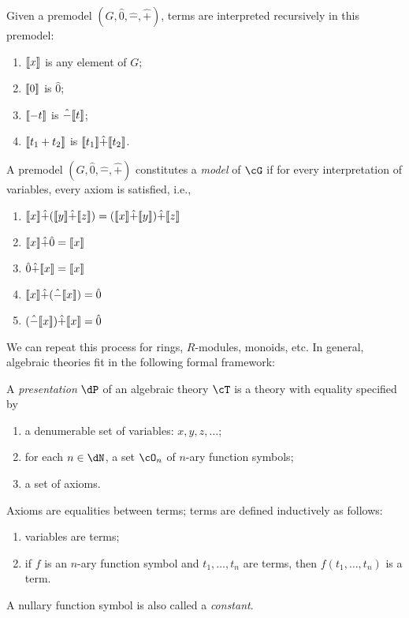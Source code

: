 \documentclass{amsart}
\begin{document}
Given a premodel $(G, \hat{0}, \hat{-}, \hat{+})$, terms are interpreted recursively in this premodel:
\begin{enumerate}
\item $\llbracket x \rrbracket$ is any element of $G$;
\item $\llbracket 0 \rrbracket$ is $\hat{0}$;
\item $\llbracket -t \rrbracket$ is $\hat{-}\llbracket t \rrbracket$;
\item $\llbracket t_{1} + t_{2} \rrbracket$ is $\llbracket t_{1} \rrbracket \hat{+} \llbracket t_{2} \rrbracket$.
\end{enumerate}

\begin{defn}
  A premodel $(G, \hat{0}, \hat{-}, \hat{+})$ constitutes a \emph{model} of $\cG$ if for every interpretation of variables, every axiom is satisfied, i.e.,
  \begin{enumerate}
  \item $\llbracket x \rrbracket \hat{+} (\llbracket y \rrbracket \hat{+} \llbracket z \rrbracket) = (\llbracket x \rrbracket \hat{+} \llbracket y \rrbracket) \hat{+} \llbracket z \rrbracket$
  \item $\llbracket x \rrbracket \hat{+} \hat{0} = \llbracket x \rrbracket$
  \item $\hat{0} \hat{+} \llbracket x \rrbracket = \llbracket x \rrbracket$
  \item $\llbracket x \rrbracket \hat{+} (\hat{-}\llbracket x \rrbracket) = \hat{0}$
  \item $(\hat{-}\llbracket x \rrbracket) \hat{+} \llbracket x \rrbracket = \hat{0}$
  \end{enumerate}
\end{defn}

We can repeat this process for rings, $R$-modules, monoids, etc.
In general, algebraic theories fit in the following formal framework:

\begin{defn}
  A \emph{presentation} $\dP$ of an algebraic theory $\cT$ is a theory with equality specified by
  \begin{enumerate}
  \item a denumerable set of variables: $x, y, z, \ldots$;
  \item for each $n \in \dN$, a set $\cO_{n}$ of $n$-ary function symbols;
  \item a set of axioms.
  \end{enumerate}
  Axioms are equalities between terms; terms are defined inductively as follows:
  \begin{enumerate}
  \item variables are terms;
  \item if $f$ is an $n$-ary function symbol and $t_{1},\ldots,t_{n}$ are terms, then $f(t_{1},\ldots,t_{n})$ is a term.
  \end{enumerate}
  A nullary function symbol is also called a \emph{constant}.
\end{defn}
\end{document}
